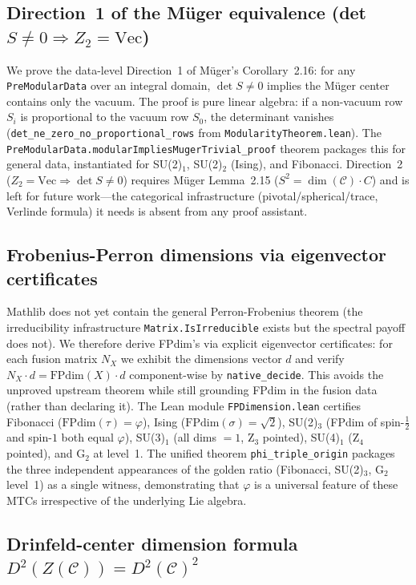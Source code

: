 \documentclass[12pt]{article}
\newcommand{\lean}[1]{\texttt{#1}}
\newcommand{\nativedecide}{\texttt{native\_decide}}
\begin{document}
\subsection{Direction~1 of the Müger equivalence (det $S \neq 0 \Rightarrow Z_2 = \mathrm{Vec}$)}

We prove the data-level Direction~1 of Müger's Corollary~2.16: for any \lean{PreModularData} over an integral domain, $\det S \neq 0$ implies the Müger center contains only the vacuum. The proof is pure linear algebra: if a non-vacuum row $S_i$ is proportional to the vacuum row $S_0$, the determinant vanishes (\lean{det\_ne\_zero\_no\_proportional\_rows} from \lean{ModularityTheorem.lean}). The \lean{PreModularData.modularImpliesMugerTrivial\_proof} theorem packages this for general data, instantiated for SU(2)$_1$, SU(2)$_2$ (Ising), and Fibonacci. Direction~2 ($Z_2 = \mathrm{Vec} \Rightarrow \det S \neq 0$) requires Müger Lemma~2.15 ($S^2 = \dim(\mathcal{C}) \cdot C$) and is left for future work---the categorical infrastructure (pivotal/spherical/trace, Verlinde formula) it needs is absent from any proof assistant.

\subsection{Frobenius-Perron dimensions via eigenvector certificates}

Mathlib does not yet contain the general Perron-Frobenius theorem (the irreducibility infrastructure \lean{Matrix.IsIrreducible} exists but the spectral payoff does not). We therefore derive FPdim's via explicit eigenvector certificates: for each fusion matrix $N_X$ we exhibit the dimensions vector $d$ and verify $N_X \cdot d = \mathrm{FPdim}(X) \cdot d$ component-wise by \nativedecide{}. This avoids the unproved upstream theorem while still grounding FPdim in the fusion data (rather than declaring it). The Lean module \lean{FPDimension.lean} certifies Fibonacci ($\mathrm{FPdim}(\tau) = \varphi$), Ising ($\mathrm{FPdim}(\sigma) = \sqrt{2}$), SU(2)$_3$ (FPdim of spin-$\tfrac{1}{2}$ and spin-$1$ both equal $\varphi$), SU(3)$_1$ (all dims $= 1$, Z$_3$ pointed), SU(4)$_1$ (Z$_4$ pointed), and G$_2$ at level~1. The unified theorem \lean{phi\_triple\_origin} packages the three independent appearances of the golden ratio (Fibonacci, SU(2)$_3$, G$_2$ level~1) as a single witness, demonstrating that $\varphi$ is a universal feature of these MTCs irrespective of the underlying Lie algebra.

\subsection{Drinfeld-center dimension formula $D^2(Z(\mathcal{C})) = D^2(\mathcal{C})^2$}
\end{document}
